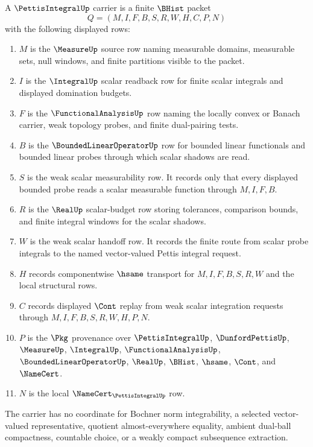 \begin{definition}
\label{def:pettis-integral-carrier}
A $\PettisIntegralUp$ carrier is a finite $\BHist$ packet
$$
Q=(M,I,F,B,S,R,W,H,C,P,N)
$$
with the following displayed rows:
\begin{enumerate}
\item $M$ is the $\MeasureUp$ source row naming measurable domains, measurable sets, null windows, and finite partitions visible to the packet.
\item $I$ is the $\IntegralUp$ scalar readback row for finite scalar integrals and displayed domination budgets.
\item $F$ is the $\FunctionalAnalysisUp$ row naming the locally convex or Banach carrier, weak topology probes, and finite dual-pairing tests.
\item $B$ is the $\BoundedLinearOperatorUp$ row for bounded linear functionals and bounded linear probes through which scalar shadows are read.
\item $S$ is the weak scalar measurability row. It records only that every displayed bounded probe reads a scalar measurable function through $M,I,F,B$.
\item $R$ is the $\RealUp$ scalar-budget row storing tolerances, comparison bounds, and finite integral windows for the scalar shadows.
\item $W$ is the weak scalar handoff row. It records the finite route from scalar probe integrals to the named vector-valued Pettis integral request.
\item $H$ records componentwise $\hsame$ transport for $M,I,F,B,S,R,W$ and the local structural rows.
\item $C$ records displayed $\Cont$ replay from weak scalar integration requests through $M,I,F,B,S,R,W,H,P,N$.
\item $P$ is the $\Pkg$ provenance over $\PettisIntegralUp$, $\DunfordPettisUp$, $\MeasureUp$, $\IntegralUp$, $\FunctionalAnalysisUp$, $\BoundedLinearOperatorUp$, $\RealUp$, $\BHist$, $\hsame$, $\Cont$, and $\NameCert$.
\item $N$ is the local $\NameCert_{\PettisIntegralUp}$ row.
\end{enumerate}
The carrier has no coordinate for Bochner norm integrability, a selected vector-valued representative, quotient almost-everywhere equality, ambient dual-ball compactness, countable choice, or a weakly compact subsequence extraction.
\end{definition}

